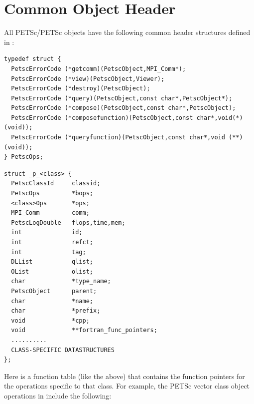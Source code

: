 \section{Common Object Header}

All PETSc/PETSc objects have the following common header structures
defined in \href{http://www.mcs.anl.gov/petsc/petsc-master/include/petsc/private/petscimpl.h.html}{}:

\begin{lstlisting}[caption=Function table common to all PETSc compatible classes]
typedef struct {
  PetscErrorCode (*getcomm)(PetscObject,MPI_Comm*);
  PetscErrorCode (*view)(PetscObject,Viewer);
  PetscErrorCode (*destroy)(PetscObject);
  PetscErrorCode (*query)(PetscObject,const char*,PetscObject*);
  PetscErrorCode (*compose)(PetscObject,const char*,PetscObject);
  PetscErrorCode (*composefunction)(PetscObject,const char*,void(*)(void));
  PetscErrorCode (*queryfunction)(PetscObject,const char*,void (**)(void));
} PetscOps;
\end{lstlisting}
\begin{lstlisting}[caption=Data structure header common to all PETSc compatible classes]
struct _p_<class> {
  PetscClassId     classid;
  PetscOps         *bops;
  <class>Ops       *ops;
  MPI_Comm         comm;
  PetscLogDouble   flops,time,mem;
  int              id;
  int              refct;
  int              tag;
  DLList           qlist;
  OList            olist;
  char             *type_name;
  PetscObject      parent;
  char             *name;
  char             *prefix;
  void             *cpp;
  void             **fortran_func_pointers;
  ..........
  CLASS-SPECIFIC DATASTRUCTURES
};
\end{lstlisting}
Here  is a function table (like the  above) that
contains the function pointers for the operations specific to that class.
For example, the PETSc vector class object operations in \href{http://www.mcs.anl.gov/petsc/petsc-master/include/petsc/private/vecimple.h.html}{} include the following:

